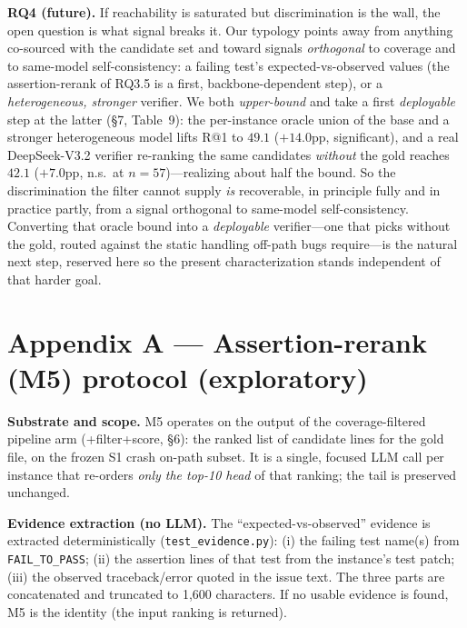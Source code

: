 \documentclass[11pt]{article}
\newcommand{\code}[1]{\texttt{#1}}
\begin{document}
\smallskip\noindent\textbf{RQ4 (future).} If reachability is saturated but discrimination is the wall, the open question is what signal breaks it. Our typology points away from anything co-sourced with the candidate set and toward signals \emph{orthogonal} to coverage and to same-model self-consistency: a failing test's expected-vs-observed values (the assertion-rerank of RQ3.5 is a first, backbone-dependent step), or a \emph{heterogeneous, stronger} verifier. We both \emph{upper-bound} and take a first \emph{deployable} step at the latter (\S7, Table~9): the per-instance oracle union of the base and a stronger heterogeneous model lifts R@1 to $49.1$ ($+14.0$pp, significant), and a real DeepSeek-V3.2 verifier re-ranking the same candidates \emph{without} the gold reaches $42.1$ ($+7.0$pp, n.s.\ at $n{=}57$)---realizing about half the bound. So the discrimination the filter cannot supply \emph{is} recoverable, in principle fully and in practice partly, from a signal orthogonal to same-model self-consistency. Converting that oracle bound into a \emph{deployable} verifier---one that picks without the gold, routed against the static handling off-path bugs require---is the natural next step, reserved here so the present characterization stands independent of that harder goal.



\section*{Appendix A --- Assertion-rerank (M5) protocol (exploratory)}

\noindent\textbf{Substrate and scope.} M5 operates on the output of the coverage-filtered pipeline arm (+filter+score, \S6): the ranked list of candidate lines for the gold file, on the frozen S1 crash on-path subset. It is a single, focused LLM call per instance that re-orders \emph{only the top-10 head} of that ranking; the tail is preserved unchanged.

\smallskip\noindent\textbf{Evidence extraction (no LLM).} The ``expected-vs-observed'' evidence is extracted deterministically (\code{test\_evidence.py}): (i) the failing test name(s) from \code{FAIL\_TO\_PASS}; (ii) the assertion lines of that test from the instance's test patch; (iii) the observed traceback/error quoted in the issue text. The three parts are concatenated and truncated to 1{,}600 characters. If no usable evidence is found, M5 is the identity (the input ranking is returned).
\end{document}
